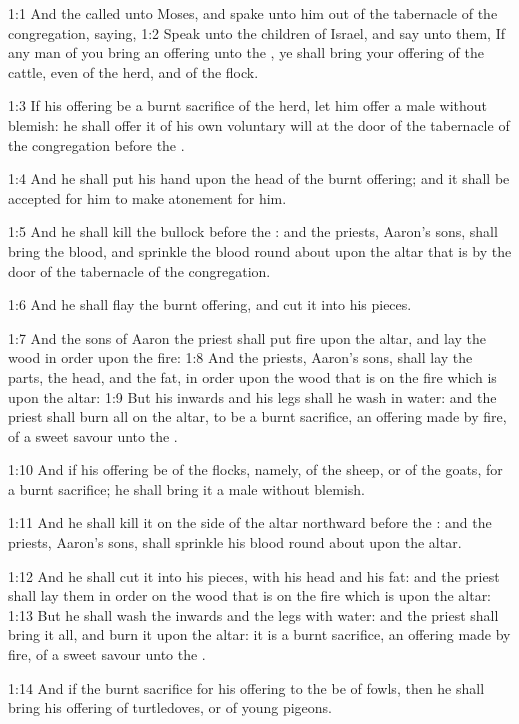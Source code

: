 

1:1 And the \LORD called unto Moses, and spake unto him out of the
tabernacle of the congregation, saying, 1:2 Speak unto the children of
Israel, and say unto them, If any man of you bring an offering unto
the \LORD, ye shall bring your offering of the cattle, even of the
herd, and of the flock.

1:3 If his offering be a burnt sacrifice of the herd, let him offer a
male without blemish: he shall offer it of his own voluntary will at
the door of the tabernacle of the congregation before the \LORD.

1:4 And he shall put his hand upon the head of the burnt offering; and
it shall be accepted for him to make atonement for him.

1:5 And he shall kill the bullock before the \LORD: and the priests,
Aaron's sons, shall bring the blood, and sprinkle the blood round
about upon the altar that is by the door of the tabernacle of the
congregation.

1:6 And he shall flay the burnt offering, and cut it into his pieces.

1:7 And the sons of Aaron the priest shall put fire upon the altar,
and lay the wood in order upon the fire: 1:8 And the priests, Aaron's
sons, shall lay the parts, the head, and the fat, in order upon the
wood that is on the fire which is upon the altar: 1:9 But his inwards
and his legs shall he wash in water: and the priest shall burn all on
the altar, to be a burnt sacrifice, an offering made by fire, of a
sweet savour unto the \LORD.

1:10 And if his offering be of the flocks, namely, of the sheep, or of
the goats, for a burnt sacrifice; he shall bring it a male without
blemish.

1:11 And he shall kill it on the side of the altar northward before
the \LORD: and the priests, Aaron's sons, shall sprinkle his blood
round about upon the altar.

1:12 And he shall cut it into his pieces, with his head and his fat:
and the priest shall lay them in order on the wood that is on the fire
which is upon the altar: 1:13 But he shall wash the inwards and the
legs with water: and the priest shall bring it all, and burn it upon
the altar: it is a burnt sacrifice, an offering made by fire, of a
sweet savour unto the \LORD.

1:14 And if the burnt sacrifice for his offering to the \LORD be of
fowls, then he shall bring his offering of turtledoves, or of young
pigeons.

